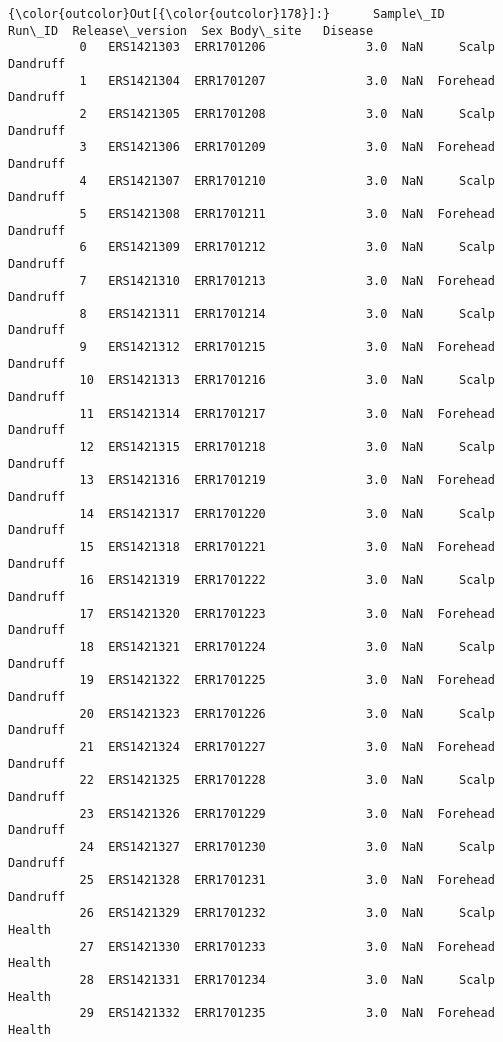 \documentclass[11pt]{article}
\begin{document}
\begin{Verbatim}[commandchars=\\\{\}]
{\color{outcolor}Out[{\color{outcolor}178}]:}      Sample\_ID      Run\_ID  Release\_version  Sex Body\_site   Disease
          0   ERS1421303  ERR1701206              3.0  NaN     Scalp  Dandruff
          1   ERS1421304  ERR1701207              3.0  NaN  Forehead  Dandruff
          2   ERS1421305  ERR1701208              3.0  NaN     Scalp  Dandruff
          3   ERS1421306  ERR1701209              3.0  NaN  Forehead  Dandruff
          4   ERS1421307  ERR1701210              3.0  NaN     Scalp  Dandruff
          5   ERS1421308  ERR1701211              3.0  NaN  Forehead  Dandruff
          6   ERS1421309  ERR1701212              3.0  NaN     Scalp  Dandruff
          7   ERS1421310  ERR1701213              3.0  NaN  Forehead  Dandruff
          8   ERS1421311  ERR1701214              3.0  NaN     Scalp  Dandruff
          9   ERS1421312  ERR1701215              3.0  NaN  Forehead  Dandruff
          10  ERS1421313  ERR1701216              3.0  NaN     Scalp  Dandruff
          11  ERS1421314  ERR1701217              3.0  NaN  Forehead  Dandruff
          12  ERS1421315  ERR1701218              3.0  NaN     Scalp  Dandruff
          13  ERS1421316  ERR1701219              3.0  NaN  Forehead  Dandruff
          14  ERS1421317  ERR1701220              3.0  NaN     Scalp  Dandruff
          15  ERS1421318  ERR1701221              3.0  NaN  Forehead  Dandruff
          16  ERS1421319  ERR1701222              3.0  NaN     Scalp  Dandruff
          17  ERS1421320  ERR1701223              3.0  NaN  Forehead  Dandruff
          18  ERS1421321  ERR1701224              3.0  NaN     Scalp  Dandruff
          19  ERS1421322  ERR1701225              3.0  NaN  Forehead  Dandruff
          20  ERS1421323  ERR1701226              3.0  NaN     Scalp  Dandruff
          21  ERS1421324  ERR1701227              3.0  NaN  Forehead  Dandruff
          22  ERS1421325  ERR1701228              3.0  NaN     Scalp  Dandruff
          23  ERS1421326  ERR1701229              3.0  NaN  Forehead  Dandruff
          24  ERS1421327  ERR1701230              3.0  NaN     Scalp  Dandruff
          25  ERS1421328  ERR1701231              3.0  NaN  Forehead  Dandruff
          26  ERS1421329  ERR1701232              3.0  NaN     Scalp    Health
          27  ERS1421330  ERR1701233              3.0  NaN  Forehead    Health
          28  ERS1421331  ERR1701234              3.0  NaN     Scalp    Health
          29  ERS1421332  ERR1701235              3.0  NaN  Forehead    Health

\end{Verbatim}
\end{document}
